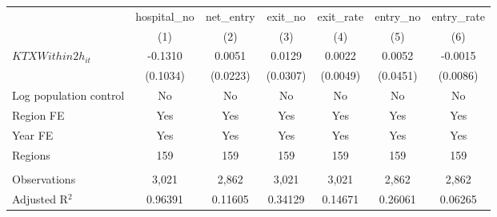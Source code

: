 \begingroup
\centering
\begin{tabular}{lcccccc}
   \toprule
                          & hospital\_no  & net\_entry  & exit\_no  & exit\_rate  & entry\_no  & entry\_rate \\    
                          & (1)           & (2)         & (3)       & (4)         & (5)        & (6)\\  
   \midrule 
   $KTXWithin2h_{it}$     & -0.1310       & 0.0051      & 0.0129    & 0.0022      & 0.0052     & -0.0015\\   
                          & (0.1034)      & (0.0223)    & (0.0307)  & (0.0049)    & (0.0451)   & (0.0086)\\   
   Log population control & No            & No          & No        & No          & No         & No\\  
   Region FE              & Yes           & Yes         & Yes       & Yes         & Yes        & Yes\\  
   Year FE                & Yes           & Yes         & Yes       & Yes         & Yes        & Yes\\  
   Regions                & 159           & 159         & 159       & 159         & 159        & 159\\  
    \\
   Observations           & 3,021         & 2,862       & 3,021     & 3,021       & 2,862      & 2,862\\  
   Adjusted R$^2$         & 0.96391       & 0.11605     & 0.34129   & 0.14671     & 0.26061    & 0.06265\\  
   \bottomrule
\end{tabular}
\par\endgroup
